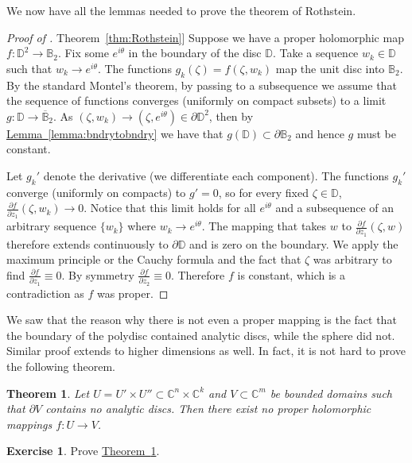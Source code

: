 \documentclass[12pt,openany]{book}
\newcommand{\C}{{\mathbb{C}}}
\newcommand{\D}{{\mathbb{D}}}
\newcommand{\bB}{{\mathbb{B}}}
\newcommand{\bD}{{\mathbb{D}}}
\theoremstyle{plain}
\newtheorem{thm}{Theorem}[section]
\theoremstyle{remark}
\theoremstyle{definition}
\newenvironment{exbox}{%
    \def\FrameCommand{\vrule width 1pt \relax\hspace {10pt}}%
    \MakeFramed {\advance \hsize -\width \FrameRestore }%
}{%
    \endMakeFramed
}
\theoremstyle{exercise}
\newtheorem{exercise}{Exercise}[section]
\theoremstyle{example}
\newcommand{\thmref}[1]{\hyperref[#1]{Theorem~\ref*{#1}}}
\newcommand{\lemmaref}[1]{\hyperref[#1]{Lemma~\ref*{#1}}}
\begin{document}
We now have all the lemmas needed to prove the theorem of Rothstein.

\begin{proof}[Proof of \thmref{thm:Rothstein}]
Suppose we have a proper holomorphic map $f \colon \D^2
\to \bB_2$.
Fix some $e^{i\theta}$ in the boundary of the disc $\bD$.  Take a sequence
$w_k \in \bD$ such that $w_k \to e^{i\theta}$.   The functions
$g_k(\zeta) =  f(\zeta,w_k)$ map the unit disc into $\bB_2$.  By the standard
Montel's theorem, by passing to a subsequence we assume that
the sequence of functions converges (uniformly on compact subsets) to
a limit $g \colon \bD \to \overline{\bB}_2$.  As $(\zeta,w_k) \to
(\zeta,e^{i\theta}) \in \partial \D^2$, then by
\lemmaref{lemma:bndrytobndry} we have that $g(\bD) \subset \partial \bB_2$
and hence $g$ must be constant.

Let $g_k'$ denote the derivative (we differentiate each component).
The functions $g_k'$ converge (uniformly on compacts)
to $g' = 0$, so for every fixed $\zeta \in \bD$,
$\frac{\partial f}{\partial z_1} (\zeta, w_k) \to 0$.
Notice that this limit holds for all $e^{i\theta}$ and a subsequence of
an arbitrary sequence $\{ w_k \}$ where $w_k \to e^{i\theta}$.  The mapping that takes $w$ to
$\frac{\partial f}{\partial z_1} (\zeta, w)$ therefore extends continuously
to $\partial \D$ and is zero on the boundary.
We apply the maximum
principle or the Cauchy formula and the fact that $\zeta$ was arbitrary to find 
$\frac{\partial f}{\partial z_1} \equiv 0$.  By symmetry
$\frac{\partial f}{\partial z_2} \equiv 0$.  Therefore $f$ is constant,
which is a contradiction as $f$ was proper.
\end{proof}

We saw that the reason why there is not even a proper mapping is the fact
that the boundary of the polydisc contained analytic discs, while
the sphere did not.
Similar proof extends to higher dimensions as well.  In fact, it is not hard
to prove the following theorem.

\begin{thm} \label{thm:nopropmapprodandnodisc}
Let $U = U' \times U'' \subset \C^n \times \C^k$ and $V \subset \C^m$ be bounded
domains such that $\partial V$ contains no analytic discs.
Then there exist no proper
holomorphic mappings $f \colon U \to V$.
\end{thm}

\begin{exbox}
\begin{exercise}
Prove \thmref{thm:nopropmapprodandnodisc}.
\end{exercise}
\end{exbox}
\end{document}
